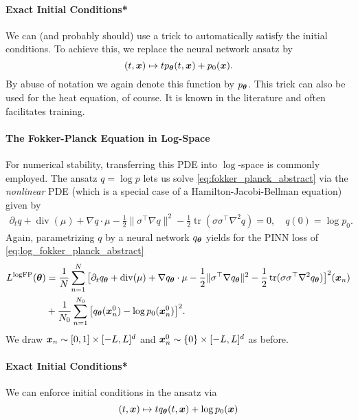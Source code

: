 \paragraph{Exact Initial Conditions*}
We can (and probably should) use a trick to automatically satisfy the initial conditions. To achieve this, we replace the neural network ansatz by
\begin{equation}
  (t,{\bm{x}})
  \mapsto
  t p_{\bm{\theta}}(t,{\bm{x}}) + p_0({\bm{x}}).
\end{equation}
By abuse of notation we again denote this function by $p_{\bm{\theta}}$. This trick can also be used for the heat equation, of course. It is known in the literature and often facilitates training. 

\paragraph{The Fokker-Planck Equation in Log-Space}
For numerical stability, transferring this PDE into $\log$-space is commonly employed. The ansatz $q = \log p$ lets us solve \eqref{eq:fokker_planck_abstract} via the \emph{nonlinear} PDE (which is a special case of a Hamilton-Jacobi-Bellman equation) given by
\begin{align}\label{eq:log_fokker_planck_abstract}
  \partial_t q
  +
  \operatorname{div}(\mu)
  +
  \nabla q \cdot \mu
  -
  \frac12 \| \sigma^\top \nabla q \|^2
  -
  \frac12 \operatorname{tr}(\sigma \sigma^\top\nabla^2 q)
  =
  0,
  \quad
  q(0) = \log p_0.
\end{align}
Again, parametrizing $q$ by a neural network $q_{\bm{\theta}}$ yields for the PINN loss of \eqref{eq:log_fokker_planck_abstract}
\begin{align*}
  L^{\textrm{logFP}}({\bm{\theta}})
  &=
    \frac{1}{N}
    \sum_{n=1}^{N}
    \big[
    \partial_t q_{{\bm{\theta}}}
    +
    \operatorname{div}(\mu)
    +
    \nabla q_{\bm{\theta}} \cdot \mu
    -
    \frac12 \| \sigma^\top\nabla q_{\bm{\theta}} \|^2
    -
    \frac12 \operatorname{tr}(\sigma\sigma^\top\nabla^2 q_{{\bm{\theta}}})
    \big]^2
    ({\bm{x}}_n)
  \\
  &+
    \frac{1}{N_0}
    \sum_{n=1}^{N_0}
    \big[
    q_{{\bm{\theta}}}({\bm{x}}_n^0) - \log p_0({\bm{x}}_n^0)
    \big]^2.
\end{align*}
We draw ${\bm{x}}_n \sim [0, 1] \times [-L, L]^d$ and ${\bm{x}}_n^0 \sim \{0\} \times [-L, L]^d$ as before.

\paragraph{Exact Initial Conditions*}
We can enforce initial conditions in the ansatz via
\begin{equation*}
  (t,{\bm{x}}) \mapsto t q_{\bm{\theta}}(t, {\bm{x}}) + \log p_0({\bm{x}})
\end{equation*}

